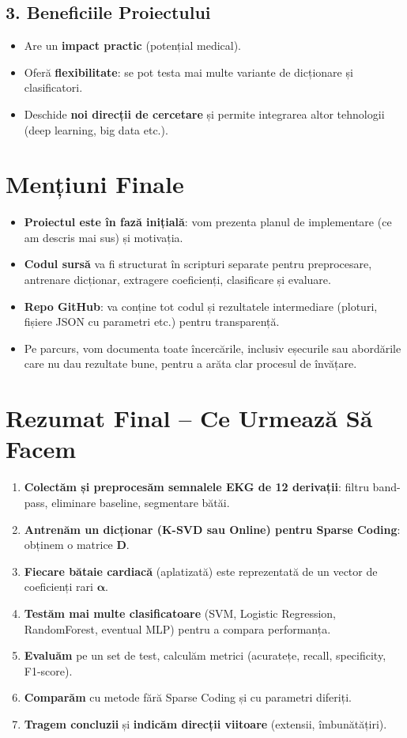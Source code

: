 \documentclass[12pt]{article}
\begin{document}
\subsection*{3. Beneficiile Proiectului}
\begin{itemize}
    \item Are un \textbf{impact practic} (potențial medical).
    \item Oferă \textbf{flexibilitate}: se pot testa mai multe variante de dicționare și clasificatori.
    \item Deschide \textbf{noi direcții de cercetare} și permite integrarea altor tehnologii (deep learning, big data etc.).
\end{itemize}

\section*{Mențiuni Finale}

\begin{itemize}
    \item \textbf{Proiectul este în fază inițială}: vom prezenta planul de implementare (ce am descris mai sus) și motivația.
    \item \textbf{Codul sursă} va fi structurat în scripturi separate pentru preprocesare, antrenare dicționar, extragere coeficienți, clasificare și evaluare.
    \item \textbf{Repo GitHub}: va conține tot codul și rezultatele intermediare (ploturi, fișiere JSON cu parametri etc.) pentru transparență.
    \item Pe parcurs, vom documenta toate încercările, inclusiv eșecurile sau abordările care nu dau rezultate bune, pentru a arăta clar procesul de învățare.
\end{itemize}

\section*{Rezumat Final -- Ce Urmează Să Facem}

\begin{enumerate}[label=(\arabic*)]
    \item \textbf{Colectăm și preprocesăm semnalele EKG de 12 derivații}: filtru band-pass, eliminare baseline, segmentare bătăi.
    \item \textbf{Antrenăm un dicționar (K-SVD sau Online) pentru Sparse Coding}: obținem o matrice $\mathbf{D}$.
    \item \textbf{Fiecare bătaie cardiacă} (aplatizată) este reprezentată de un vector de coeficienți rari $\boldsymbol{\alpha}$.
    \item \textbf{Testăm mai multe clasificatoare} (SVM, Logistic Regression, RandomForest, eventual MLP) pentru a compara performanța.
    \item \textbf{Evaluăm} pe un set de test, calculăm metrici (acuratețe, recall, specificity, F1-score).
    \item \textbf{Comparăm} cu metode fără Sparse Coding și cu parametri diferiți.
    \item \textbf{Tragem concluzii} și \textbf{indicăm direcții viitoare} (extensii, îmbunătățiri).
\end{enumerate}
\end{document}
